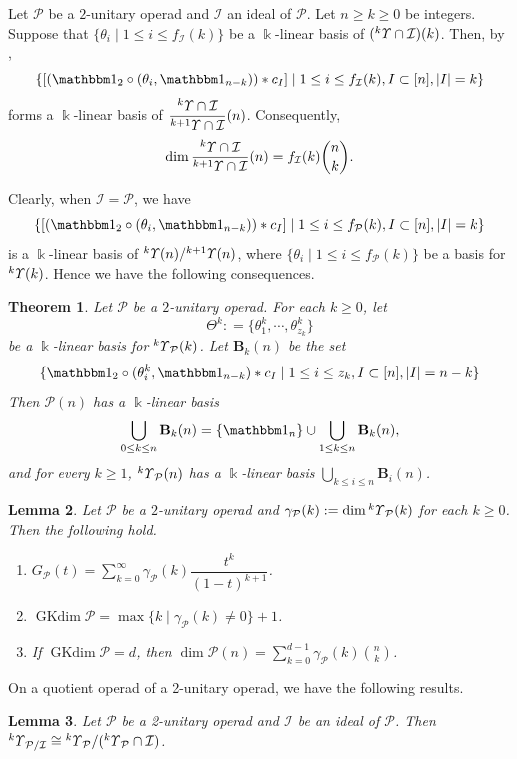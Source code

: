 \documentclass{amsart}
\newtheorem{thm}{Theorem}[section]
\newtheorem{lem}[thm]{Lemma}
\theoremstyle{definition}
\theoremstyle{remark}
\numberwithin{equation}{section}
\newcommand{\up}[1]{{^{#1}{\it \!\Upsilon}}}
\def \I{\mathcal{I}}
\def \ip{{\mathcal{P}}}
\def \dim{\operatorname{dim}}
\def\gkdim{\operatorname{GKdim}}
\def \1{\mathbbm 1}
\begin{document}
Let $\ip$ be a $2$-unitary operad and $\I$ an ideal of 
$\ip$. Let $n\ge k\ge 0$ be integers. Suppose that 
$\{\theta_i\mid 1\le i\le f_{\I}(k)\}$ be a $\Bbbk$-linear 
basis of $(\up{k}\cap \I)(k)$. Then, by \cite[Theorem 4.5]{BYZ},
\[\{[(\1_2\circ (\theta_i, \1_{n-k}))\ast c_I]
\mid 1\le i\le f_\I(k), I\subset [n], |I|=k\}\]
forms a $\Bbbk$-linear basis of 
$\dfrac{\up{k}\cap \I}{\up{k+1}\cap \I}(n)$. Consequently,
\[\dim \dfrac{\up{k}\cap \I}{\up{k+1}\cap \I}(n)
=f_\I(k){n\choose k}.\]

Clearly, when $\I=\ip$, we have 
\[\{[(\1_2\circ (\theta_i, \1_{n-k}))\ast c_I]
\mid 1\le i\le f_\ip(k), I\subset [n], |I|=k\}\]
is a $\Bbbk$-linear basis of $\up{k}(n)/\up{k+1}(n)$, where 
$\{\theta_i\mid 1\le i\le f_\ip(k)\}$ be a basis for 
$\up{k}(k)$. Hence we have the following consequences.


\begin{thm}
\cite[Theorem 4.6(1)]{BYZ}
\label{yythm1.3}
Let $\ip$ be a $2$-unitary operad. For each $k\ge 0$, let
\[\Theta^k\colon =\{\theta_1^k, \cdots, \theta_{z_k}^k\}\]
be a $\Bbbk$-linear basis for $\up{k}_\ip(k)$. Let 
$\textbf{B}_k(n)$ be the set
\[\{\1_2\circ (\theta_i^k, \1_{n-k})\ast c_I
\mid 1\le i\le z_k, I\subset [n], |I|=n-k\}\]
Then $\ip(n)$ has a $\Bbbk$-linear basis
\[\bigcup\limits_{0\le k\le n} \textbf{B}_k(n)
=\{\1_n\}\cup \bigcup\limits_{1\le k\le n} \textbf{B}_k(n),\]
and for every $k\ge 1$, $\up{k}_\ip(n)$ has a 
$\Bbbk$-linear basis $\bigcup_{k\le i\le n} \textbf{B}_i(n)$.
\end{thm}


\begin{lem}
\cite[Lemma 5.2]{BYZ}
\label{yylem1.4}
Let $\ip$ be a $2$-unitary operad and 
$\gamma_\ip(k):=\dim \up{k}_\ip(k)$ 
for each $k\ge 0$. Then the following hold.
\begin{enumerate}
\item[(1)] 
$G_\ip(t)=\sum\limits_{k=0}^\infty 
\gamma_\ip(k)\dfrac{t^k}{(1-t)^{k+1}}$.
\item[(2)] 
$\gkdim \ip=\max\{k\mid \gamma_\ip(k)\neq 0\}+1$.
\item[(3)] 
If $\gkdim\ip=d$, then 
$\dim\ip(n)=\sum\limits_{k=0}^{d-1}\gamma_\ip(k)
{n\choose k}$.
\end{enumerate}
\end{lem}

On a quotient operad of a 2-unitary operad, we have the following 
results.

\begin{lem}
\cite[Lemma 4.7]{BYZ}
\label{yylem1.5}
Let $\ip$ be a 2-unitary operad and $\I$ be an ideal of $\ip$. 
Then $\up{k}_{\ip/\I}\cong \up{k}_\ip/(\up{k}_\ip\cap \I)$.
\end{lem}
\end{document}
